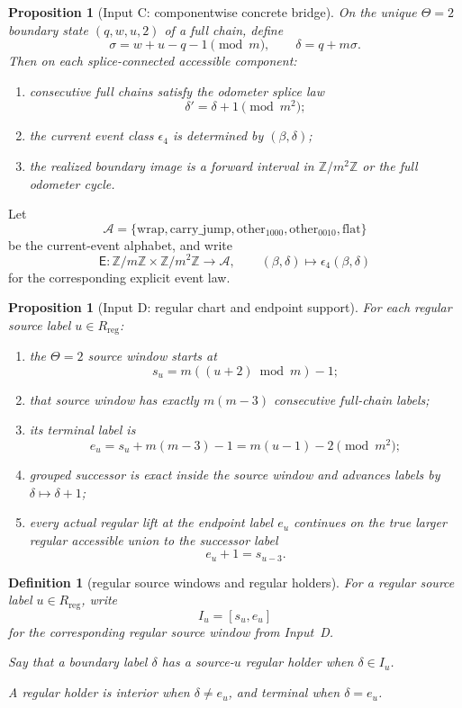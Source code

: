 \documentclass[11pt]{article}
\newtheorem{proposition}[theorem]{Proposition}
\newtheorem{definition}[theorem]{Definition}
\newcommand{\Z}{\mathbb Z}
\newcommand{\Acal}{\mathcal A}
\newcommand{\Ev}{\mathsf E}
\begin{document}
\begin{proposition}[Input C: componentwise concrete bridge]
On the unique $\Theta=2$ boundary state $(q,w,u,2)$ of a full chain, define
\[
\sigma = w+u-q-1 \pmod m,
\qquad
\delta=q+m\sigma.
\]
Then on each splice-connected accessible component:
\begin{enumerate}[label=\textup{(\arabic*)},leftmargin=2.5em]
\item consecutive full chains satisfy the odometer splice law
      \[
      \delta'=\delta+1 \pmod{m^2};
      \]
\item the current event class $\epsilon_4$ is determined by $(\beta,\delta)$;
\item the realized boundary image is a forward interval in $\Z/m^2\Z$ or the
      full odometer cycle.
\end{enumerate}
\end{proposition}

Let
\[
\Acal=
\{\mathrm{wrap},\mathrm{carry\_jump},\mathrm{other}_{1000},
  \mathrm{other}_{0010},\mathrm{flat}\}
\]
be the current-event alphabet, and write
\[
\Ev:\Z/m\Z\times \Z/m^2\Z\longrightarrow \Acal,
\qquad
(\beta,\delta)\longmapsto \epsilon_4(\beta,\delta)
\]
for the corresponding explicit event law.

\begin{proposition}[Input D: regular chart and endpoint support]
For each regular source label $u\in R_{\mathrm{reg}}$:
\begin{enumerate}[label=\textup{(\arabic*)},leftmargin=2.5em]
\item the $\Theta=2$ source window starts at
      \[
      s_u=m((u+2)\bmod m)-1;
      \]
\item that source window has exactly $m(m-3)$ consecutive full-chain labels;
\item its terminal label is
      \[
      e_u=s_u+m(m-3)-1=m(u-1)-2 \pmod{m^2};
      \]
\item grouped successor is exact inside the source window and advances labels
      by $\delta\mapsto \delta+1$;
\item every actual regular lift at the endpoint label $e_u$ continues on the
      true larger regular accessible union to the successor label
      \[
      e_u+1=s_{u-3}.
      \]
\end{enumerate}
\end{proposition}

\begin{definition}[regular source windows and regular holders]
For a regular source label $u\in R_{\mathrm{reg}}$, write
\[
I_u=[s_u,e_u]
\]
for the corresponding regular source window from Input~D.

Say that a boundary label $\delta$ has a \emph{source-$u$ regular holder} when
$\delta\in I_u$.

A regular holder is \emph{interior} when $\delta\neq e_u$, and \emph{terminal}
when $\delta=e_u$.
\end{definition}
\end{document}
